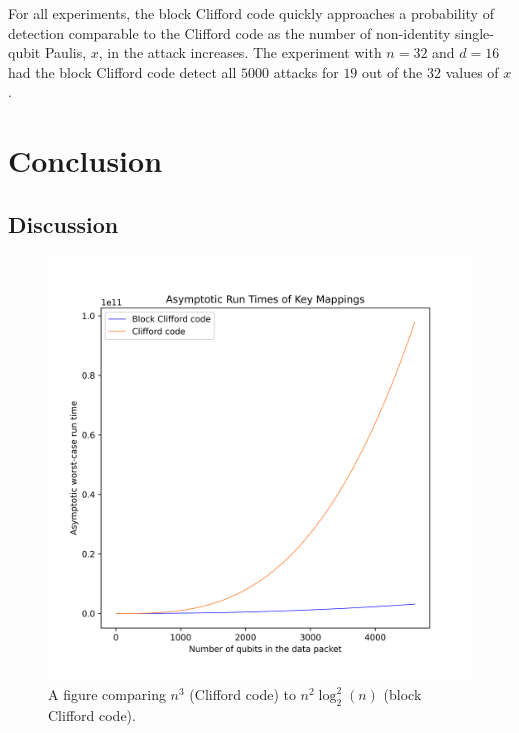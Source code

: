 For all experiments, the block Clifford code quickly approaches a probability of detection comparable to the Clifford code as the number of non-identity single-qubit Paulis, $x$, in the attack increases. The experiment with $n = 32$ and $d = 16$ had the block Clifford code detect all $5000$ attacks for $19$ out of the $32$ values of $x$.

\chapter{Conclusion}
\label{sec:Conclusion}
\section{Discussion}
\label{sec:Discussion}
\begin{figure}
    \centering
    \includegraphics[scale=0.6]{Figures/keymapping_runtimes.png}
    \caption{A figure comparing $n^3$ (Clifford code) to $n^2 \log_2^2 (n)$ (block Clifford code).}
    \label{fig:keyMappingRunTimesComparison}
\end{figure}

